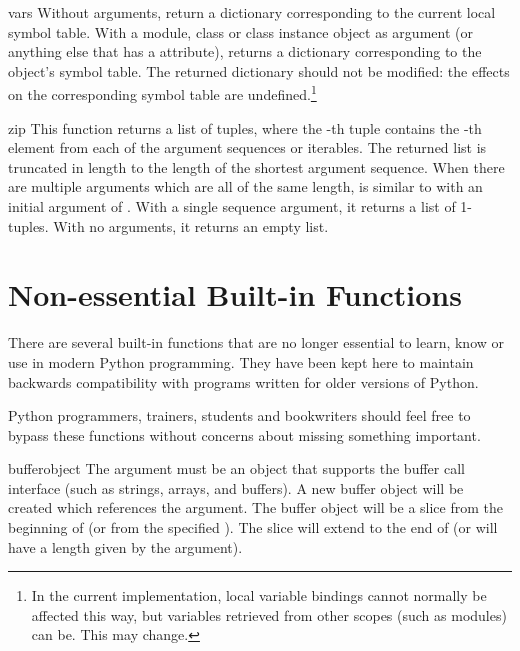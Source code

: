 \begin{funcdesc}{vars}{}
  Without arguments, return a dictionary corresponding to the current
  local symbol table.  With a module, class or class instance object
  as argument (or anything else that has a 
  attribute), returns a dictionary corresponding to the object's
  symbol table.  The returned dictionary should not be modified: the
  effects on the corresponding symbol table are undefined.\footnote{
    In the current implementation, local variable bindings cannot
    normally be affected this way, but variables retrieved from
    other scopes (such as modules) can be.  This may change.}
\end{funcdesc}

\begin{funcdesc}{zip}{}
  This function returns a list of tuples, where the -th tuple contains
  the -th element from each of the argument sequences or iterables.
  The returned list is truncated in length to the length of
  the shortest argument sequence.  When there are multiple arguments
  which are all of the same length,  is
  similar to  with an initial argument of .
  With a single sequence argument, it returns a list of 1-tuples.
  With no arguments, it returns an empty list.

\end{funcdesc}




\section{Non-essential Built-in Functions \label{non-essential-built-in-funcs}}

There are several built-in functions that are no longer essential to learn,
know or use in modern Python programming.  They have been kept here to
maintain backwards compatibility with programs written for older versions
of Python.

Python programmers, trainers, students and bookwriters should feel free to
bypass these functions without concerns about missing something important.



\begin{funcdesc}{buffer}{object}
  The  argument must be an object that supports the buffer
  call interface (such as strings, arrays, and buffers).  A new buffer
  object will be created which references the  argument.
  The buffer object will be a slice from the beginning of 
  (or from the specified ). The slice will extend to the
  end of  (or will have a length given by the 
  argument).
\end{funcdesc}

